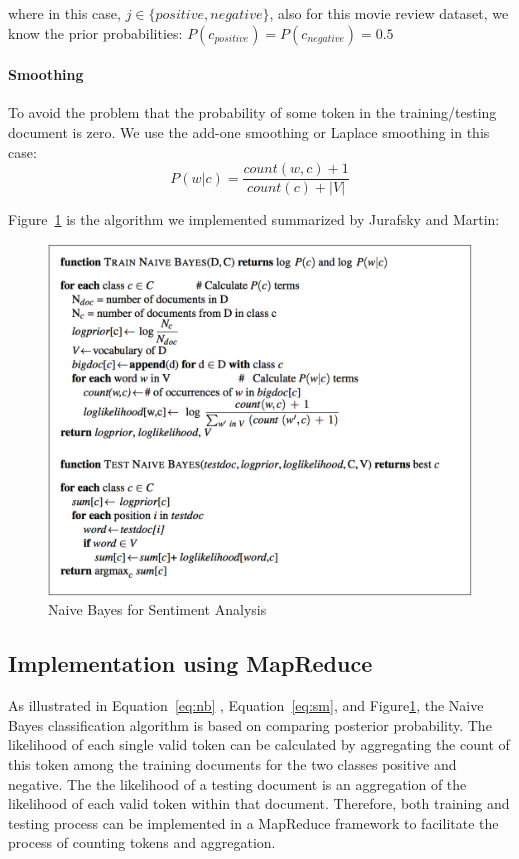where in this case, $j \in \{positive, negative\}$, also for this movie review 
dataset, we know the prior probabilities: 
$P(c_{positive})=P(c_{negative})=0.5$

\paragraph{Smoothing}
To avoid the problem that the probability of some token in the 
training/testing document is zero. We use the add-one smoothing or Laplace 
smoothing in this case:
\begin{equation}\label{eq:sm}
P(w|c) = \frac{count(w,c) + 1}{count(c) + |V|}
\end{equation}

Figure~\ref{f:algo} is the algorithm we implemented summarized by Jurafsky 
and Martin:
\begin{figure}[!ht]
		\centering\includegraphics[width=\columnwidth]{images/algorithm.png}
		\caption{Naive Bayes for Sentiment 
		Analysis~\cite{hid-sp18-405-sentiment-jurafsky2009}}\label{f:algo}
\end{figure}

\subsection{Implementation using MapReduce}

As illustrated in Equation~\ref{eq:nb} , Equation~\ref{eq:sm}, and 
Figure\ref{f:algo}, the Naive Bayes classification algorithm is based on 
comparing posterior probability. The likelihood of each single valid token can 
be calculated by aggregating the count of this token among the training 
documents for the two classes positive and negative. The the likelihood of a 
testing document is an aggregation of the likelihood of each valid token 
within that document. Therefore, both training and testing process can be 
implemented in a MapReduce framework to facilitate the process of counting 
tokens and aggregation. 

